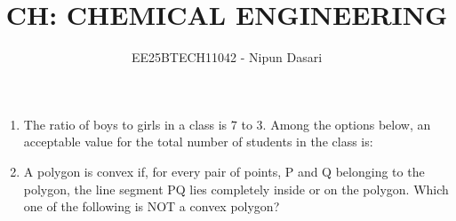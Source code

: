 \documentclass[journal,12pt,onecolumn]{IEEEtran}
\title{CH: CHEMICAL ENGINEERING}
\author{EE25BTECH11042 - Nipun Dasari}
\date{   }
\theoremstyle{remark}
\begin{document}
	
	
	\vspace{3cm}
	
	\maketitle
	\begin{enumerate}
		
		\item The ratio of boys to girls in a class is $7$ to $3$. Among the options below, an acceptable value for the total number of students in the class is:
		
		\hfill{}
		
		\begin{enumerate}
		\end{enumerate}
		
		\item A polygon is convex if, for every pair of points, P and Q belonging to the polygon, the line segment PQ lies completely inside or on the polygon. Which one of the following is NOT a convex polygon?
		
		\hfill{}
		

\end{enumerate}
\end{document}
